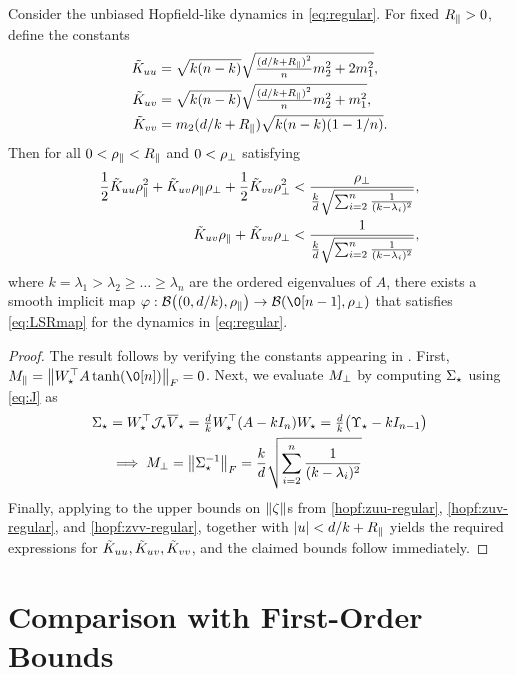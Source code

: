 \documentclass[a4paper]{cas-dc}
\begin{document}
\begin{theorem}
    \label{thm:lsr2-regular}
    Consider the unbiased Hopfield-like dynamics in \eqref{eq:regular}.
    For fixed \(R_{\parallel} > 0\), define the constants
    \begin{align*}
        \tilde{K}_{uu} & = \sqrt{k(n-k)}\sqrt{\tfrac{(d/k+R_{\parallel})^2}{n} m_2^2 + 2 m_1^2}, \\
        \tilde{K}_{uv} & = \sqrt{k(n-k)}\sqrt{\tfrac{(d/k+R_{\parallel})^2}{n} m_2^2 + m_1^2},   \\
        \tilde{K}_{vv} & = m_2(d/k+R_{\parallel})\sqrt{k(n-k)(1-1/n)}.
    \end{align*}
    Then for all \(0 < \rho_{\parallel} < R_{\parallel}\) and \(0 < \rho_{\perp}\) satisfying
    \begin{align*}
        \frac12\tilde{K}_{uu}\rho_{\parallel}^2 + \tilde{K}_{uv}\rho_{\parallel}\rho_{\perp} + \frac12\tilde{K}_{vv}\rho_{\perp}^2 & < \frac{\rho_{\perp}}{\tfrac{k}{d}\sqrt{\sum_{i=2}^{n}\tfrac{1}{(k-\lambda_i)^{2}}}}, \\
        \tilde{K}_{uv}\rho_{\parallel} + \tilde{K}_{vv}\rho_{\perp}                                      & < \frac{1}{\tfrac{k}{d}\sqrt{\sum_{i=2}^{n}\tfrac{1}{(k-\lambda_i)^{2}}}},
    \end{align*}
    where \(k = \lambda_1 > \lambda_2 \ge \dots \ge \lambda_n\) are the ordered eigenvalues of \(A\),
    there exists a smooth implicit map \(\varphi : \mathcal{B}\bigl((0,d/k), \rhopr\bigr) \to \mathcal{B}(\0[n-1], \rhopp)\) that satisfies \eqref{eq:LSRmap} for the dynamics in \eqref{eq:regular}.
\end{theorem}
\begin{proof}
    The result follows by verifying the constants appearing in . First, \(\Mpr = \norm{\W^{\top}A\tanh(\0[n])}_F = 0\).
    Next, we evaluate \(M_{\perp}\) by computing \(\Sigma_{\star }\) using \eqref{eq:J} as
    \begin{align*}
        \Sigma_{\star } & = W_{\star }^{\top}\mathcal{J}_{\star }\overline{V}_{\star } = \tfrac{d}{k}W_{\star }^{\top}(A-kI_{n})W_{\star } = \tfrac{d}{k}\bigl(\Upsilon_{\star }-kI_{n-1}\bigr) \\
           & \implies M_{\perp} = \norm{\Sigma_{\star }^{-1}}_F = \frac{k}{d}\sqrt{\sum_{i=2}^{n}\frac{1}{(k-\lambda_i)^2}}
    \end{align*}
    Finally, applying  to the upper bounds on \(\norm{\zeta}\)s from \eqref{hopf:zuu-regular}, \eqref{hopf:zuv-regular}, and \eqref{hopf:zvv-regular}, together with \(\abs{u} < d/k + R_{\parallel}\) yields the required expressions for \(\tilde{K}_{uu},\tilde{K}_{uv},\tilde{K}_{vv}\), and the claimed bounds follow immediately.
\end{proof}



\section{Comparison with First-Order Bounds}
\label{sec:1v2}
\end{document}
